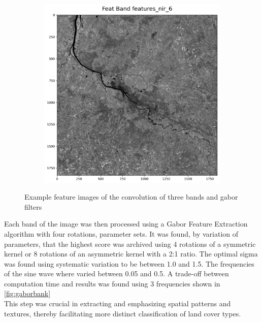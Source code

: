 \documentclass[12pt,a4paper, english,twoside]{article}
\begin{document}
\begin{figure}[!htbp]
\begin{subfigure}[b]{0.3\textwidth}
      \end{subfigure}
      \begin{subfigure}[b]{0.3\textwidth}
        \includegraphics[width=\textwidth]{img/Features_nir_6.png}
      \end{subfigure}
     \caption{Example feature images of the convolution of three bands and gabor filters\label{fig:gaborresults}}
    \end{figure}
 \noindent 
      Each band of the image was then processed using a Gabor Feature Extraction algorithm with four rotations, parameter sets. 
      It was found, by variation of parameters, that the highest score was archived using 4 rotations of a symmetric kernel or 8 rotations of an asymmetric kernel with a 2:1 ratio.
      The optimal sigma was found using systematic variation to be between 1.0 and 1.5. 
      The frequencies of the sine wave where varied between 0.05 and 0.5. A trade-off between computation time and results was found using 3 frequencies shown in \cref{fig:gaborbank} \\ 
     This step was crucial in extracting and emphasizing spatial patterns and textures, thereby facilitating more distinct classification of land cover types. 
\end{document}

